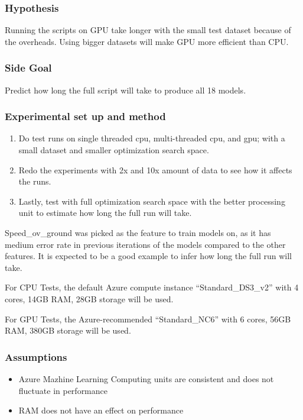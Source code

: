 \documentclass[12pt,twoside]{report}
\begin{document}
\subsubsection{Hypothesis}
Running the scripts on GPU take longer with the small test dataset because of the overheads. Using bigger datasets will make GPU more efficient than CPU.

\subsubsection{Side Goal}
Predict how long the full script will take to produce all 18 models.

\subsubsection{Experimental set up and method}
\begin{enumerate}
    \item Do test runs on single threaded cpu, multi-threaded cpu, and gpu; with a small dataset and smaller optimization search space.
    \item Redo the experiments with 2x and 10x amount of data to see how it affects the runs.
    \item Lastly, test with full optimization search space with the better processing unit to estimate how long the full run will take.
\end{enumerate}

Speed\_ov\_ground was picked as the feature to train models on, as it has medium error rate in previous iterations of the models compared to the other features. It is expected to be a good example to infer how long the full run will take.

For CPU Tests, the default Azure compute instance “Standard\_DS3\_v2” with 4 cores, 14GB RAM, 28GB storage will be used.

For GPU Tests, the Azure-recommended “Standard\_NC6” with 6 cores, 56GB RAM, 380GB storage will be used.

\subsubsection{Assumptions}
\begin{itemize}
  \item Azure Mazhine Learning Computing units are consistent and does not fluctuate in performance 
  \item RAM does not have an effect on performance
\end{itemize}
\end{document}
